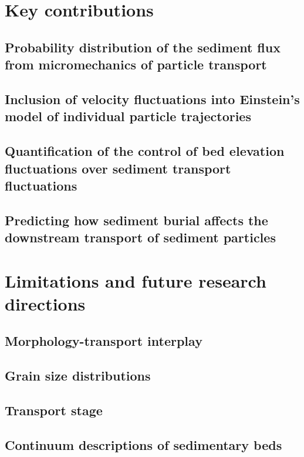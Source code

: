 \section{Key contributions}

\subsection{Probability distribution of the sediment flux from micromechanics of particle transport}

\subsection{Inclusion of velocity fluctuations into Einstein's model of individual particle trajectories}

\subsection{Quantification of the control of bed elevation fluctuations over sediment transport fluctuations}

\subsection{Predicting how sediment burial affects the downstream transport of sediment particles}

\section{Limitations and future research directions}

\subsection{Morphology-transport interplay}

\subsection{Grain size distributions}

\subsection{Transport stage}

\subsection{Continuum descriptions of sedimentary beds}

